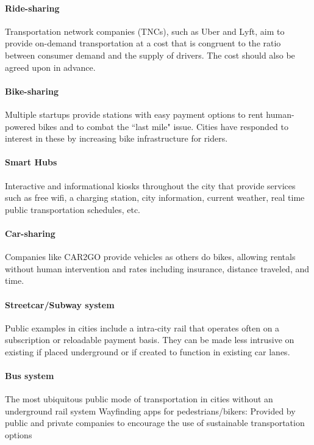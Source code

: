 \documentclass[12pt]{article}                       %
\begin{document}
\paragraph{Ride-sharing} Transportation network companies (TNCs), such as Uber and Lyft, aim to provide on-demand transportation at a cost that is congruent to the ratio between consumer demand and the supply of drivers. The cost should also be agreed upon in advance.

\paragraph{Bike-sharing} Multiple startups provide stations with easy payment options to rent human-powered bikes and to combat the “last mile" issue. Cities have responded to interest in these by increasing bike infrastructure for riders.

\paragraph{Smart Hubs} Interactive and informational kiosks throughout the city that provide services such as free wifi, a charging station, city information, current weather, real time public transportation schedules, etc. 

\paragraph{Car-sharing} Companies like CAR2GO provide vehicles as others do bikes, allowing rentals without human intervention and rates including insurance, distance traveled, and time.

\paragraph{Streetcar/Subway system} Public examples in cities include a intra-city rail that operates often on a subscription or reloadable payment basis. They can be made less intrusive on existing if placed underground or if created to function in existing car lanes.

\paragraph{Bus system} The most ubiquitous public mode of transportation in cities without an underground rail system
Wayfinding apps for pedestrians/bikers: Provided by public and private companies to encourage the use of sustainable transportation options
\end{document}
